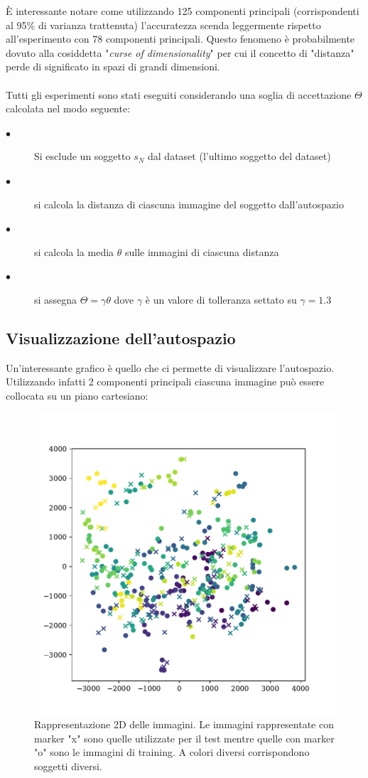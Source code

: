 \noindent È interessante notare come utilizzando 125 componenti principali (corrispondenti al 95\% di varianza trattenuta) l'accuratezza scenda leggermente rispetto all'esperimento con 78 componenti principali. Questo fenomeno è probabilmente dovuto alla cosiddetta "\textit{curse of dimensionality}" per cui il concetto di "distanza" perde di significato in spazi di grandi dimensioni.
\\
\\
\noindent Tutti gli esperimenti sono stati eseguiti considerando una soglia di accettazione \(\Theta\) calcolata nel modo seguente:
\begin{description}
    \item[\(\bullet\)] Si esclude un soggetto \(s_N\) dal dataset (l'ultimo soggetto del dataset)
    \item[\(\bullet\)] si calcola la distanza di ciascuna immagine del soggetto dall'autospazio
    \item[\(\bullet\)] si calcola la media \(\theta\) sulle immagini di ciascuna distanza  
    \item[\(\bullet\)] si assegna \(\Theta = \gamma \theta\) dove \(\gamma\) è un valore di tolleranza settato su \(\gamma = 1.3\) 
\end{description}
\newpage
\subsection*{Visualizzazione dell'autospazio}
Un'interessante grafico è quello che ci permette di visualizzare l'autospazio. Utilizzando infatti 2 componenti principali ciascuna immagine può essere collocata su un piano cartesiano:
\begin{figure}[H]
    \centering
    \includegraphics[scale = 0.7]{pictures/visualization.pdf}
    \caption{Rappresentazione 2D delle immagini. Le immagini rappresentate con marker "x" sono quelle utilizzate per il test mentre quelle con marker "o" sono le immagini di training. A colori diversi corrispondono soggetti diversi.}
    \label{visualization}
\end{figure}